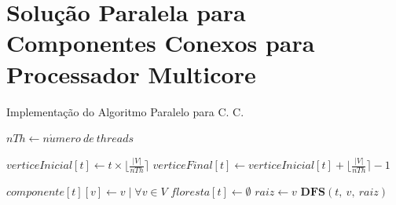 \documentclass[12pt]{article}
\begin{document}
\section{Solução Paralela para Componentes Conexos para Processador Multicore}

{\color{gray}\lipsum[1]}

\begin{algorithm}[H]
    \DontPrintSemicolon
    \caption{Implementação do Algoritmo Paralelo para C. C.}
    {
        $nTh \gets n\acute{u}mero\ de\ threads$\;

        {
        	$verticeInicial[t] \gets t \times \lfloor \frac{|V|}{nTh} \rceil$\;
        	$verticeFinal[t] \gets verticeInicial[t] + \lfloor \frac{|V|}{nTh} \rceil-1$\;
        }
        
        
        {
        
            $componente[t][v] \gets v \mid \forall v \in V$\;
            $floresta[t] \gets \emptyset$\;
            {
                {
                    $raiz \gets v$\;
                    $\textbf{DFS}(t,\ v,\ raiz)$\;
                }
            }
        }
        
}
\end{algorithm}
\end{document}
